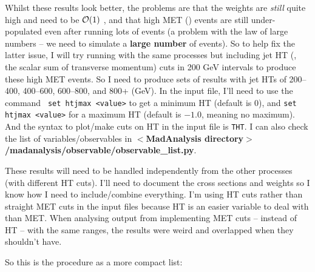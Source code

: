 Whilst these results look better, the problems are that the weights are \emph{still} quite high and need to be $\order{1}$ , and that high MET (\etmiss) events are still under-populated even after running lots of \madgraph events (a problem with the law of large numbers -- we need to simulate a \textbf{large number} of events). So to help fix the latter issue, I will try running \madgraph with the same processes but including jet HT (\HT, the scalar sum of transverse momentum) cuts in 200 GeV intervals to produce these high MET events. So I need to produce sets of results with jet HTs of 200--400, 400--600, 600--800, and 800+ (GeV). In the \madgraph input file, I'll need to use the command \verb! set htjmax <value>! to get a minimum HT (default is 0), and \verb!set htjmax <value>! for a maximum HT (default is $-1.0$, meaning no maximum). And the syntax to plot/make cuts on HT in the \madanalysis input file is \verb!THT!. I can also check the list of variables/observables in \textbf{$<$MadAnalysis directory$>$/madanalysis/observable/observable\_list.py}.

These results will need to be handled independently from the other processes (with different HT cuts). I'll need to document the cross sections and weights so I know how I need to include/combine everything. I'm using HT cuts rather than straight MET cuts in the \madgraph input files because HT is an easier variable to deal with than MET. When analysing output from implementing MET cuts -- instead of HT -- with the same ranges, the results were weird and overlapped when they shouldn't have.

So this is the procedure as a more compact list:

